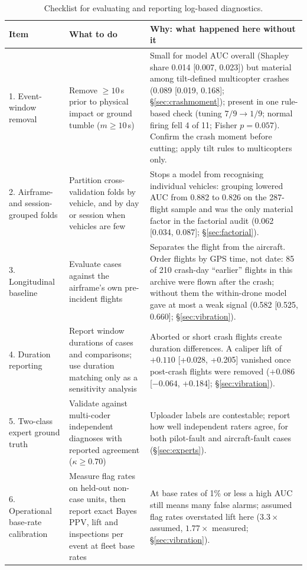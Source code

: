\documentclass[preprint,12pt]{elsarticle}
\begin{document}
\begin{table}[!htbp]
\centering
\caption{Checklist for evaluating and reporting log-based diagnostics.}
\label{tab:checklist}
\scriptsize
\begin{tabularx}{\textwidth}{@{}p{} p{} X@{}}
\toprule
Item & What to do & Why: what happened here without it \\
\midrule
1. Event-window removal & Remove $\ge 10$\,s prior to physical impact or ground tumble ($m \ge 10$\,s) & Small for model AUC overall (Shapley share 0.014 [0.007, 0.023]) but material among tilt-defined multicopter crashes (0.089 [0.019, 0.168]; §\ref{sec:crashmoment}); present in one rule-based check (tuning $7/9 \to 1/9$; normal firing fell 4 of 11; Fisher $p=0.057$). Confirm the crash moment before cutting; apply tilt rules to multicopters only. \\
2. Airframe- and session-grouped folds & Partition cross-validation folds by vehicle, and by day or session when vehicles are few & Stops a model from recognising individual vehicles: grouping lowered AUC from 0.882 to 0.826 on the 287-flight sample and was the only material factor in the factorial audit (0.062 [0.034, 0.087]; §\ref{sec:factorial}). \\
3. Longitudinal baseline & Evaluate cases against the airframe's own pre-incident flights & Separates the flight from the aircraft. Order flights by GPS time, not date: 85 of 210 crash-day ``earlier'' flights in this archive were flown after the crash; without them the within-drone model gave at most a weak signal (0.582 [0.525, 0.660]; §\ref{sec:vibration}). \\
4. Duration reporting & Report window durations of cases and comparisons; use duration matching only as a sensitivity analysis & Aborted or short crash flights create duration differences. A caliper lift of $+0.110$ [+0.028, +0.205] vanished once post-crash flights were removed ($+0.086$ [$-0.064$, +0.184]; §\ref{sec:vibration}). \\
5. Two-class expert ground truth & Validate against multi-coder independent diagnoses with reported agreement ($\kappa \ge 0.70$) & Uploader labels are contestable; report how well independent raters agree, for both pilot-fault and aircraft-fault cases (§\ref{sec:experts}). \\
6. Operational base-rate calibration & Measure flag rates on held-out non-case units, then report exact Bayes PPV, lift and inspections per event at fleet base rates & At base rates of 1\% or less a high AUC still means many false alarms; assumed flag rates overstated lift here ($3.3\times$ assumed, $1.77\times$ measured; §\ref{sec:vibration}). \\

\end{tabularx}
\end{table}
\end{document}
